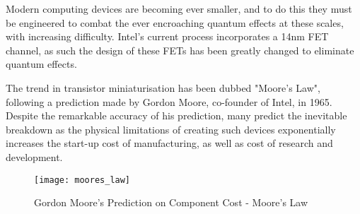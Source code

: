 Modern computing devices are becoming ever smaller, and to do this they must be engineered to combat the ever encroaching quantum effects at these scales, with increasing difficulty. Intel's current process incorporates a 14nm FET channel, as such the design of these FETs has been greatly changed to eliminate quantum effects.\cite{intel_process}

The trend in transistor miniaturisation has been dubbed "Moore's Law", following a prediction made by Gordon Moore, co-founder of Intel, in 1965.\cite{moores_law} Despite the remarkable accuracy of his prediction, many predict \cite{end_of_Moore_1, end_of_Moore_2} the inevitable breakdown as the physical limitations of creating such devices exponentially increases the start-up cost of manufacturing, as well as cost of research and development.

\begin{figure}[htbp!]
	\centering
	\texttt{[image: moores\_law]}
	\caption{Gordon Moore's Prediction on Component Cost - Moore's Law}
	\label{fig::moores_law}
\end{figure}
